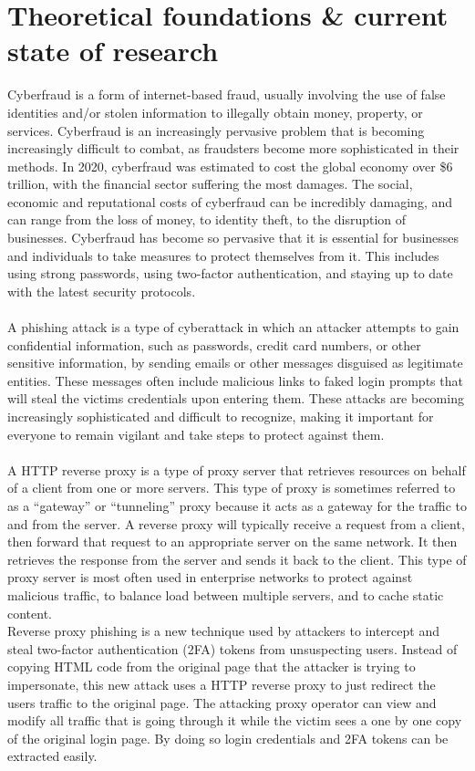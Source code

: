 \documentclass [14pt]{extarticle}
\begin{document}
\section{Theoretical foundations \& current state of research}
Cyberfraud is a form of internet-based fraud, usually involving the use of false identities and/or stolen information to illegally obtain money, property, or services. Cyberfraud is an increasingly pervasive problem that is becoming increasingly difficult to combat, as fraudsters become more sophisticated in their methods.
In 2020, cyberfraud was estimated to cost the global economy over \$6 trillion\cite{6trillion}, with the financial sector suffering the most damages. The social, economic and reputational costs of cyberfraud can be incredibly damaging, and can range from the loss of money, to identity theft, to the disruption of businesses. Cyberfraud has become so pervasive that it is essential for businesses and individuals to take measures to protect themselves from it. This includes using strong passwords, using two-factor authentication, and staying up to date with the latest security protocols. \\ \\
A phishing attack is a type of cyberattack in which an attacker attempts to gain confidential information, such as passwords, credit card numbers, or other sensitive information, by sending emails or other messages disguised as legitimate entities. These messages often include malicious links to faked login prompts that will steal the victims credentials upon entering them. These attacks are becoming increasingly sophisticated and difficult to recognize, making it important for everyone to remain vigilant and take steps to protect against them. \\ \\
A HTTP reverse proxy is a type of proxy server that retrieves resources on behalf of a client from one or more servers. This type of proxy is sometimes referred to as a “gateway” or “tunneling” proxy because it acts as a gateway for the traffic to and from the server. A reverse proxy will typically receive a request from a client, then forward that request to an appropriate server on the same network. It then retrieves the response from the server and sends it back to the client. This type of proxy server is most often used in enterprise networks to protect against malicious traffic, to balance load between multiple servers, and to cache static content. \\
Reverse proxy phishing is a new technique used by attackers to intercept and steal two-factor authentication (2FA) tokens from unsuspecting users. Instead of copying HTML code from the original page that the attacker is trying to impersonate, this new attack uses a HTTP reverse proxy to just redirect the users traffic to the original page. The attacking proxy operator can view and modify all traffic that is going through it while the victim sees a one by one copy of the original login page. By doing so login credentials and 2FA tokens can be extracted easily. \\ \\
\end{document}
